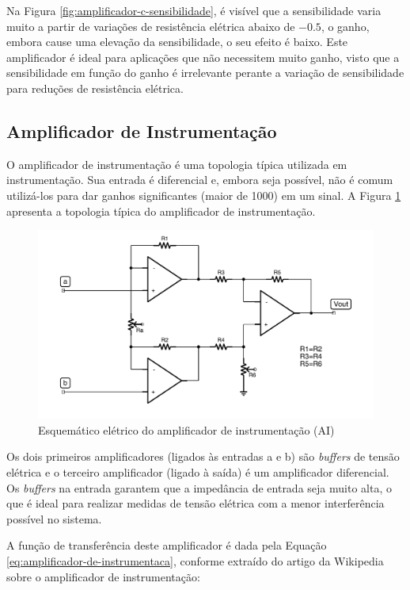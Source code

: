 \documentclass[a4paper]{instrumentacao}
\begin{document}
Na Figura \ref{fig:amplificador-c-sensibilidade}, é visível que a sensibilidade varia muito a partir de variações de resistência elétrica abaixo de $-0.5$, o ganho, embora cause uma elevação da sensibilidade, o seu efeito é baixo. Este amplificador é ideal para aplicações que não necessitem muito ganho, visto que a sensibilidade em função do ganho é irrelevante perante a variação de sensibilidade para reduções de resistência elétrica.

\subsection{Amplificador de Instrumentação}

O amplificador de instrumentação é uma topologia típica utilizada em instrumentação. Sua entrada é diferencial e, embora seja possível, não é comum utilizá-los para dar ganhos significantes (maior de 1000) em um sinal. A Figura \ref{fig:amplificador-instrumentacao} apresenta a topologia típica do amplificador de instrumentação.

\begin{figure}[H]
\center
\includegraphics[width=\textwidth]{Amplificador-Instrumentacao.pdf}
\caption{Esquemático elétrico do amplificador de instrumentação (AI)}
\label{fig:amplificador-instrumentacao}
\end{figure}

Os dois primeiros amplificadores (ligados às entradas a e b) são \textit{buffers} de tensão elétrica e o terceiro amplificador (ligado à saída) é um amplificador diferencial. Os \textit{buffers} na entrada garantem que a impedância de entrada seja muito alta, o que é ideal para realizar medidas de tensão elétrica com a menor interferência possível no sistema.

A função de transferência deste amplificador é dada pela Equação \ref{eq:amplificador-de-instrumentaca}, conforme extraído do artigo da Wikipedia\cite{wikipedia-ia} sobre o amplificador de instrumentação:
\end{document}
